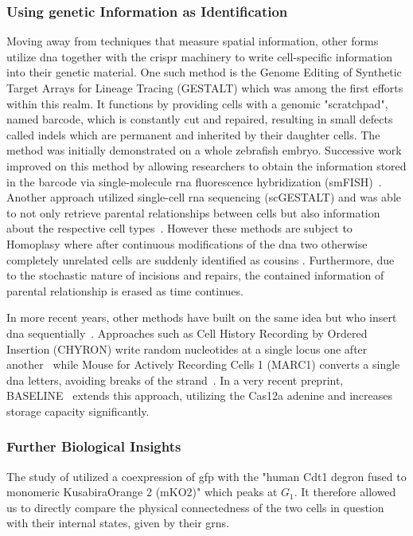 \subsubsection{Using genetic Information as Identification}
Moving away from techniques that measure spatial information, other forms utilize \ac{dna} together
with the \ac{crispr} machinery to write cell-specific information into their genetic material.
One such method is the Genome Editing of Synthetic Target Arrays for Lineage Tracing (GESTALT)
\cite{McKenna2016} which was among the first efforts within this realm.
It functions by providing cells with a genomic "scratchpad", named barcode, which is constantly cut
and repaired, resulting in small defects called indels which are permanent and inherited by their
daughter cells.
The method was initially demonstrated on a whole zebrafish embryo.
Successive work improved on this method by allowing researchers to obtain the information stored in
the barcode via single-molecule \ac{rna} fluorescence hybridization (smFISH)~\cite{Frieda2016}.
Another approach utilized single-cell \ac{rna} sequencing (scGESTALT) and was able to not only
retrieve parental relationships between cells but also information about the respective cell
types~\cite{Raj2018}.
However these methods are subject to Homoplasy where after continuous modifications of the \ac{dna}
two otherwise completely unrelated cells are suddenly identified as cousins
\cite{SalvadorMartnez2019,Jones2020}.
Furthermore, due to the stochastic nature of incisions and repairs, the contained information of
parental relationship is erased as time continues.

In more recent years, other methods have built on the same idea but who insert \ac{dna}
sequentially~\cite{Choi2022}.
Approaches such as Cell History Recording by Ordered Insertion (CHYRON) write random nucleotides
at a single locus one after another~\cite{Loveless2021} while Mouse for Actively Recording Cells 1
(MARC1) converts a single \ac{dna} letters, avoiding breaks of the strand~\cite{Hwang2019}.
In a very recent preprint, BASELINE~\cite{Winter2025} extends this approach, utilizing the Cas12a
adenine and increases storage capacity significantly.

\subsubsection{Further Biological Insights}
The study of \citet{Gershony2014} utilized a coexpression of \ac{gfp} with the "human Cdt1 degron
fused to monomeric Kusabira­Orange 2 (mKO2)" which peaks at $G_1$.
It therefore allowed us to directly compare the physical connectedness of the two cells in question
with their internal states, given by their \acp{grn}.

